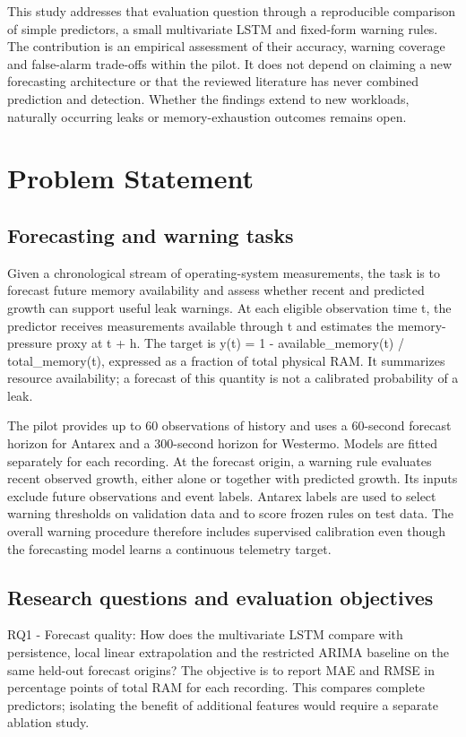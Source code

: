 \documentclass[10pt,a4paper,twocolumn]{article}
\begin{document}
This study addresses that evaluation question through a reproducible comparison of simple predictors, a small multivariate LSTM and fixed-form warning rules. The contribution is an empirical assessment of their accuracy, warning coverage and false-alarm trade-offs within the pilot. It does not depend on claiming a new forecasting architecture or that the reviewed literature has never combined prediction and detection. Whether the findings extend to new workloads, naturally occurring leaks or memory-exhaustion outcomes remains open.

\section{Problem Statement}

\subsection{Forecasting and warning tasks}

Given a chronological stream of operating-system measurements, the task is to forecast future memory availability and assess whether recent and predicted growth can support useful leak warnings. At each eligible observation time t, the predictor receives measurements available through t and estimates the memory-pressure proxy at t + h. The target is y(t) = 1 - available\_memory(t) / total\_memory(t), expressed as a fraction of total physical RAM. It summarizes resource availability; a forecast of this quantity is not a calibrated probability of a leak.

The pilot provides up to 60 observations of history and uses a 60-second forecast horizon for Antarex and a 300-second horizon for Westermo. Models are fitted separately for each recording. At the forecast origin, a warning rule evaluates recent observed growth, either alone or together with predicted growth. Its inputs exclude future observations and event labels. Antarex labels are used to select warning thresholds on validation data and to score frozen rules on test data. The overall warning procedure therefore includes supervised calibration even though the forecasting model learns a continuous telemetry target.

\subsection{Research questions and evaluation objectives}

RQ1 - Forecast quality: How does the multivariate LSTM compare with persistence, local linear extrapolation and the restricted ARIMA baseline on the same held-out forecast origins? The objective is to report MAE and RMSE in percentage points of total RAM for each recording. This compares complete predictors; isolating the benefit of additional features would require a separate ablation study.
\end{document}
